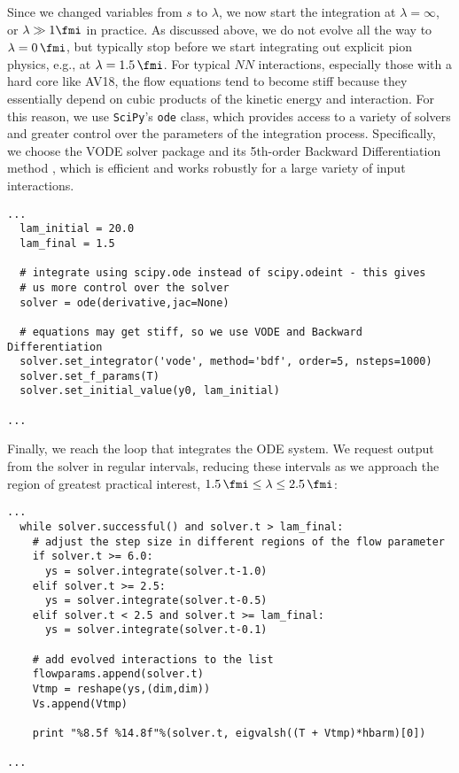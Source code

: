 
Since we changed variables from $s$ to $\lambda$, we now start the
integration at $\lambda=\infty$, or $\lambda\gg 1\fmi$ in practice.
As discussed above, we do not evolve all the way to $\lambda=0\,\fmi$,
but typically stop before we start integrating out explicit pion
physics, e.g., at $\lambda=1.5\,\fmi$. For typical $NN$ interactions,
especially those with a hard core like AV18, the flow equations tend
to become stiff because they essentially depend on cubic products of
the kinetic energy and interaction. For this reason, we use \texttt{SciPy}'s
\texttt{ode} class, which provides access to a variety of solvers
and greater control over the parameters of the integration process.
Specifically, we choose the VODE solver package and its 5th-order 
Backward Differentiation method \cite{Brown:1989wj}, which is 
efficient and works robustly for a large variety of input interactions.

\begin{lstlisting}
...
  lam_initial = 20.0
  lam_final = 1.5

  # integrate using scipy.ode instead of scipy.odeint - this gives
  # us more control over the solver
  solver = ode(derivative,jac=None)

  # equations may get stiff, so we use VODE and Backward Differentiation
  solver.set_integrator('vode', method='bdf', order=5, nsteps=1000)
  solver.set_f_params(T)
  solver.set_initial_value(y0, lam_initial)

...
\end{lstlisting}

Finally, we reach the loop that integrates the ODE system. We request
output from the solver in regular intervals, reducing these intervals
as we approach the region of greatest practical interest, 
$1.5\,\fmi\leq \lambda \leq 2.5\,\fmi$: 

\begin{lstlisting}
...
  while solver.successful() and solver.t > lam_final:
    # adjust the step size in different regions of the flow parameter
    if solver.t >= 6.0:
      ys = solver.integrate(solver.t-1.0)
    elif solver.t >= 2.5:
      ys = solver.integrate(solver.t-0.5)
    elif solver.t < 2.5 and solver.t >= lam_final:
      ys = solver.integrate(solver.t-0.1)

    # add evolved interactions to the list
    flowparams.append(solver.t)
    Vtmp = reshape(ys,(dim,dim))
    Vs.append(Vtmp)

    print "%8.5f %14.8f"%(solver.t, eigvalsh((T + Vtmp)*hbarm)[0])

...
\end{lstlisting}

